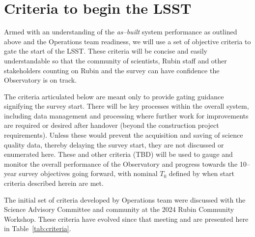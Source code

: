 \section{Criteria to begin the LSST}

Armed with an understanding of the {\it as--built} system performance as outlined above and the Operations team readiness, we will use a set of objective criteria to gate the start of the LSST. These criteria will be concise and easily understandable so that the community of scientists, Rubin staff and other stakeholders counting on Rubin and the survey can have confidence the Observatory is on track.

The criteria articulated below are meant only to provide gating guidance signifying the survey start. There will be key processes within the overall system, including data management and processing where further work for improvements are required or desired after handover (beyond the construction project requirements). Unless these would prevent the acquisition and saving of science quality data, thereby delaying the survey start, they are not discussed or enumerated here.  These and other criteria (TBD) will be used to gauge and monitor the overall performance of the Observatory and progress towards the 10--year survey objectives going forward, with nominal $T_0$ defined by when start criteria described herein are met.

The initial set of criteria developed by Operations team were discussed with the Science Advisory Committee and community at the 2024 Rubin Community Workshop. These criteria have evolved since that meeting and are presented here in Table~\ref{tab:criteria}.

